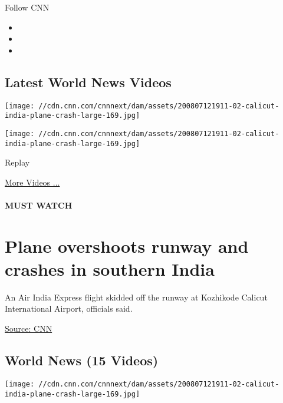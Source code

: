 Follow CNN

\begin{itemize}
\item
\item
\item
\end{itemize}

\hypertarget{latest-world-news-videos}{%
\subsection{Latest World News Videos}\label{latest-world-news-videos}}

\texttt{[image: //cdn.cnn.com/cnnnext/dam/assets/200807121911-02-calicut-india-plane-crash-large-169.jpg]}

\texttt{[image: //cdn.cnn.com/cnnnext/dam/assets/200807121911-02-calicut-india-plane-crash-large-169.jpg]}\href{javascript:void(0);}{}

Replay

\href{/videos}{More Videos ...}

\hypertarget{must-watch}{%
\paragraph{MUST WATCH}\label{must-watch}}

\hypertarget{plane-overshoots-runway-and-crashes-in-southern-india}{%
\section{Plane overshoots runway and crashes in southern
India}\label{plane-overshoots-runway-and-crashes-in-southern-india}}

An Air India Express flight skidded off the runway at Kozhikode Calicut
International Airport, officials said.

\href{}{Source: CNN}

\hypertarget{world-news-15-videos}{%
\subsection{World News (15 Videos)}\label{world-news-15-videos}}

\href{/videos/world/2020/08/07/plane-crash-kozhikode-international-airport-air-india-express-vedika-sud-intl-vpx.cnn/video/playlists/around-the-world/}{}

\texttt{[image: //cdn.cnn.com/cnnnext/dam/assets/200807121911-02-calicut-india-plane-crash-large-169.jpg]}

